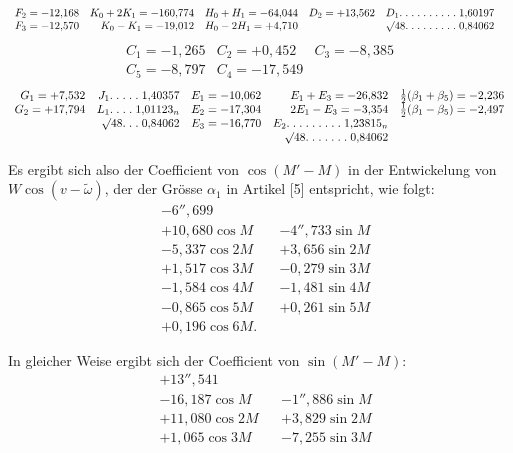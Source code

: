 \begin{landscape}
\[\begin{array}{rrrrrr}
F_2=-12{,}168&K_0+2K_1=-160{,}774&H_0+H_1=-64{,}044&D_2=+13{,}562&D_1\mathord{.}\mkern5mu\mathord{.}\mkern5mu\mathord{.}\mkern5mu\mathord{.}\mkern5mu\mathord{.}\mkern5mu\mathord{.}\mkern5mu\mathord{.}\mkern5mu\mathord{.}\mkern5mu\mathord{.}\mkern5mu\mathord{.}\mkern5mu1{,}60197&\\
F_3=-12{,}570&K_0-K_1=-19{,}012&H_0-2H_1=+4{,}710&&\mathord{{}^{}\!\surd}48\mathord{.}\mkern5mu\mathord{.}\mkern5mu\mathord{.}\mkern5mu\mathord{.}\mkern5mu\mathord{.}\mkern5mu\mathord{.}\mkern5mu\mathord{.}\mkern5mu\mathord{.}\mkern5mu\mathord{.}\mkern5mu0{,}84062&
\end{array}
\]
\[
\begin{array}{rrr}
C_1=-1{,}265&C_2=+0{,}452&C_3=-8{,}385\\
C_5=-8{,}797&C_4=-17{,}549&
\end{array}
\]
\[
\begin{array}{rrrrr}
G_1=+7{,}532&J_1\mathord{.}\mkern5mu\mathord{.}\mkern5mu\mathord{.}\mkern5mu\mathord{.}\mkern5mu\mathord{.}\mkern5mu1{,}40357&E_1=-10{,}062&E_1+E_3=-26{,}832&\frac12(\beta_1+\beta_5)=-2{,}236\\
G_2=+17{,}794&L_1\mathord{.}\mkern5mu\mathord{.}\mkern5mu\mathord{.}\mkern5mu\mathord{.}\mkern5mu1{,}01123_n&E_2=-17{,}304&2E_1-E_3=-3{,}354&\frac12(\beta_1-\beta_5)=-2{,}497\\
&\mathord{{}^{}\!\surd}48\mathord{.}\mkern5mu\mathord{.}\mkern5mu\mathord{.}\mkern5mu0{,}84062&E_3=-16{,}770&E_2\mathord{.}\mkern5mu\mathord{.}\mkern5mu\mathord{.}\mkern5mu\mathord{.}\mkern5mu\mathord{.}\mkern5mu\mathord{.}\mkern5mu\mathord{.}\mkern5mu\mathord{.}\mkern5mu\mathord{.}\mkern5mu1{,}23815_n&\\
&&&\mathord{{}^{}\!\surd}48\mathord{.}\mkern5mu\mathord{.}\mkern5mu\mathord{.}\mkern5mu\mathord{.}\mkern5mu\mathord{.}\mkern5mu\mathord{.}\mkern5mu\mathord{.}\mkern5mu0{,}84062&
\end{array}
\]
\par\noindent\hspace*{\parindent}Es ergibt sich also der Coefficient von \(\cos(M'-M)\) in der Entwickelung von \(W\cos(v-\tilde\omega)\), der der Grösse \(\alpha_1\) in Artikel [5] entspricht, wie folgt:
\[
\begin{aligned}
&-6''{,}699\\
&+10{,}680\cos M&&-4''{,}733\sin M\\
&-5{,}337\cos2M&&+3{,}656\sin2M\\
&+1{,}517\cos3M&&-0{,}279\sin3M\\
&-1{,}584\cos4M&&-1{,}481\sin4M\\
&-0{,}865\cos5M&&+0{,}261\sin5M\\
&+0{,}196\cos6M.
\end{aligned}
\]
\par\noindent In gleicher Weise ergibt sich der Coefficient von \(\sin(M'-M)\):
\[
\begin{aligned}
&+13''{,}541\\
&-16{,}187\cos M&&-1''{,}886\sin M\\
&+11{,}080\cos2M&&+3{,}829\sin2M\\
&+1{,}065\cos3M&&-7{,}255\sin3M\\

\end{aligned}\]
\end{landscape}
